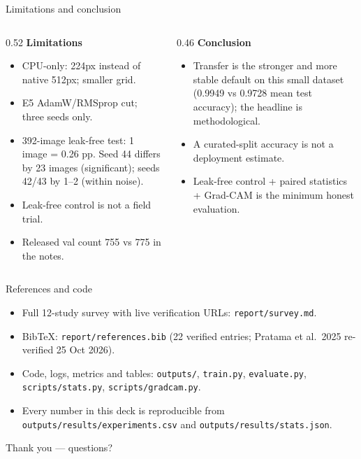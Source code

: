 \documentclass[aspectratio=169]{beamer}
\begin{document}
\begin{frame}{Limitations and conclusion}
  \begin{columns}[T]
    \begin{column}{0.52\textwidth}
      \textbf{Limitations}
      \begin{itemize}
        \item CPU-only: 224px instead of native 512px; smaller grid.
        \item E5 AdamW/RMSprop cut; three seeds only.
        \item 392-image leak-free test: 1 image = 0.26 pp. Seed 44 differs
              by 23 images (significant); seeds 42/43 by 1--2 (within noise).
        \item Leak-free control is not a field trial.
        \item Released val count 755 vs 775 in the notes.
      \end{itemize}
    \end{column}
    \begin{column}{0.46\textwidth}
      \textbf{Conclusion}
      \begin{itemize}
        \item Transfer is the stronger and more stable default on this small
              dataset (0.9949 vs 0.9728 mean test accuracy); the headline is
              methodological.
        \item A curated-split accuracy is not a deployment estimate.
        \item Leak-free control + paired statistics + Grad-CAM is the minimum
              honest evaluation.
      \end{itemize}
    \end{column}
  \end{columns}
\end{frame}
\begin{frame}{References and code}
  \scriptsize
  \begin{itemize}
    \item Full 12-study survey with live verification URLs:
          \texttt{report/survey.md}.
    \item BibTeX: \texttt{report/references.bib} (22 verified entries;
          Pratama et al.\ 2025 re-verified 25 Oct 2026).
    \item Code, logs, metrics and tables:
          \texttt{outputs/}, \texttt{train.py}, \texttt{evaluate.py},
          \texttt{scripts/stats.py}, \texttt{scripts/gradcam.py}.
    \item Every number in this deck is reproducible from
          \texttt{outputs/results/experiments.csv} and
          \texttt{outputs/results/stats.json}.
  \end{itemize}
  \vspace{4mm}
  \centering\Large Thank you --- questions?
\end{frame}
\end{document}
